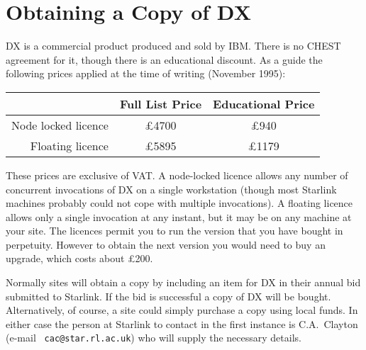 \section{Obtaining a Copy of DX \label{OBTAIN}  }

DX is a commercial product produced and sold by IBM. There is no CHEST
agreement for it, though there is an educational discount. As a guide
the following prices applied at the time of writing (November 1995):

\begin{center}
\begin{tabular}{rcc}
                    &  Full List Price &  Educational Price \\ \hline
Node locked licence &  \pounds 4700    & \pounds 940   \\
Floating licence    &  \pounds 5895    & \pounds 1179  \\
\end{tabular}
\end{center}

These prices are exclusive of VAT. A node-locked licence allows any
number of concurrent invocations of DX on a single workstation (though
most Starlink machines probably could not cope with multiple
invocations). A floating licence allows only a single invocation at any
instant, but it may be on any machine at your site. The licences permit
you to run the version that you have bought in perpetuity. However to
obtain the next version you would need to buy an upgrade, which costs
about \pounds 200.

Normally sites will obtain a copy by including an item for DX in their
annual bid submitted to Starlink. If the bid is successful a copy of
DX will be bought. Alternatively, of course, a site could simply
purchase a copy using local funds. In either case the person at Starlink
to contact in the first instance is C.A.~Clayton (e-mail {\tt
cac@star.rl.ac.uk}) who will supply the necessary details.


\typeout{  }
\typeout{*****************************************************}
\typeout{  }
\typeout{  }
\typeout{*****************************************************}
\typeout{  }


